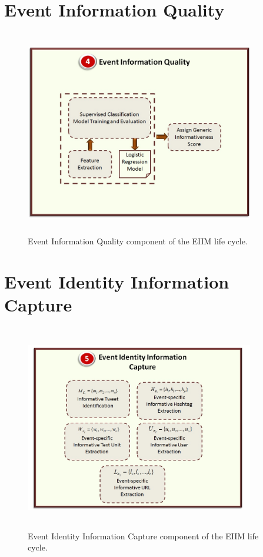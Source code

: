 \section{Event Information Quality}

\begin{figure}[htbp]
  \caption{Event Information Quality component of the EIIM life cycle.}
  \centering
    \includegraphics[width=10cm,height=9cm]{Figures/EIIMComponents/EventInformationQuality.jpg}
\end{figure}

\section{Event Identity Information Capture}

\begin{figure}[htbp]
  \caption{Event Identity Information Capture component of the EIIM life cycle.}
  \centering
    \includegraphics[width=10cm,height=9cm]{Figures/EIIMComponents/EventIdentityInformationCapture.jpg}
\end{figure}

